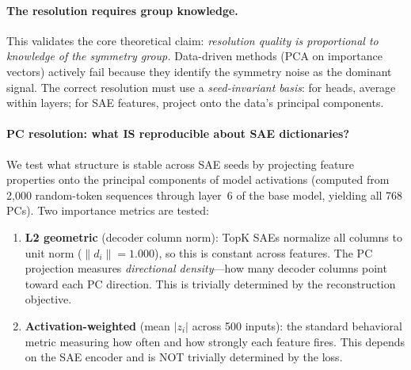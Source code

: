 \documentclass{article}
\begin{document}
\paragraph{The resolution requires group knowledge.}
This validates the core theoretical claim: \emph{resolution quality is proportional to knowledge of the symmetry group.} Data-driven methods (PCA on importance vectors) actively fail because they identify the symmetry noise as the dominant signal. The correct resolution must use a \emph{seed-invariant basis}: for heads, average within layers; for SAE features, project onto the data's principal components.

\paragraph{PC resolution: what IS reproducible about SAE dictionaries?}
We test what structure is stable across SAE seeds by projecting feature properties onto the principal components of model activations (computed from 2{,}000 random-token sequences through layer~6 of the base model, yielding all 768 PCs). Two importance metrics are tested:
\begin{enumerate}
  \item \textbf{L2 geometric} (decoder column norm): TopK SAEs normalize all columns to unit norm ($\|d_i\| = 1.000$), so this is constant across features. The PC projection measures \emph{directional density}---how many decoder columns point toward each PC direction. This is trivially determined by the reconstruction objective.
  \item \textbf{Activation-weighted} (mean $|z_i|$ across 500 inputs): the standard behavioral metric measuring how often and how strongly each feature fires. This depends on the SAE encoder and is NOT trivially determined by the loss.
\end{enumerate}
\end{document}
